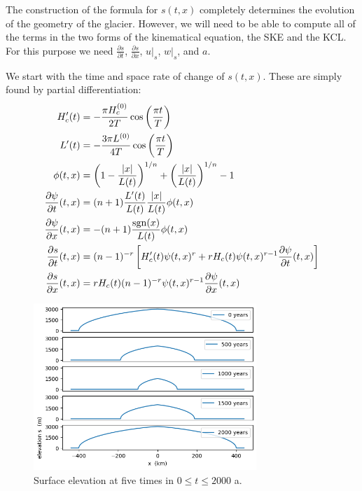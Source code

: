 \documentclass[letterpaper,final,12pt,reqno]{amsart}
\newcommand{\sgn}{\operatorname{sgn}}
\begin{document}
The construction of the formula for $s(t,x)$ completely determines the evolution of the geometry of the glacier.  However, we will need to be able to compute all of the terms in the two forms of the kinematical equation, the SKE and the KCL.  For this purpose we need $\frac{\partial s}{\partial t}$, $\frac{\partial s}{\partial x}$, $u|_s$, $w|_s$, and $a$.

We start with the time and space rate of change of $s(t,x)$.  These are simply found by partial differentiation:
\begin{align}
H_c'(t) &= - \frac{\pi H_c^{(0)}}{2T} \cos\left(\frac{\pi t}{T}\right) \notag\\
L'(t) &= - \frac{3 \pi L^{(0)}}{4T} \cos\left(\frac{\pi t}{T}\right) \notag \\
\phi(t,x) &= \left(1 - \frac{|x|}{L(t)}\right)^{1/n} + \left(\frac{|x|}{L(t)}\right)^{1/n} - 1 \notag \\
\frac{\partial \psi}{\partial t}(t,x) &= (n+1) \frac{L'(t)}{L(t)} \frac{|x|}{L(t)} \phi(t,x) \notag \\
\frac{\partial \psi}{\partial x}(t,x) &= - (n+1) \frac{\sgn(x)}{L(t)} \phi(t,x) \notag \\
\frac{\partial s}{\partial t}(t,x) &= (n-1)^{-r} \left[H_c'(t) \psi(t,x)^r + r H_c(t) \psi(t,x)^{r-1} \frac{\partial \psi}{\partial t}(t,x)\right] \label{dsdtformula} \\
\frac{\partial s}{\partial x}(t,x) &= r H_c(t) (n-1)^{-r} \psi(t,x)^{r-1} \frac{\partial \psi}{\partial x}(t,x) \label{dsdxformula}
\end{align}

\begin{figure}[t]
\includegraphics[width=0.75\textwidth]{surfacesnaps}
\caption{Surface elevation at five times in $0\le t \le 2000$ a.}
\label{surfacesnaps}
\end{figure}
\end{document}
